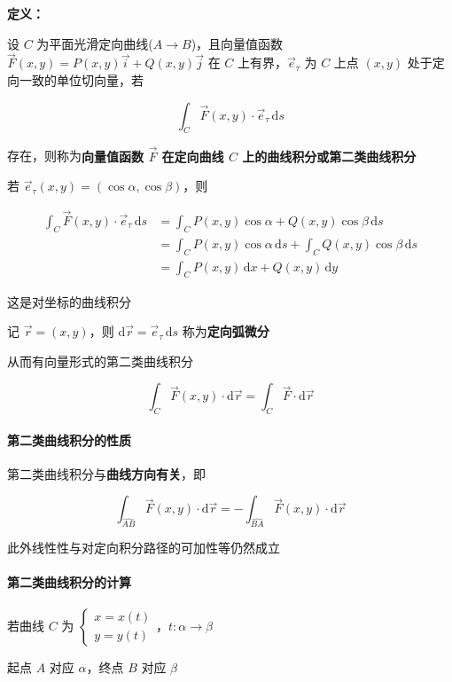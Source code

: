 \documentclass[lang = zh , final , oneside , openany , titlepage , zihao = -4 , linespread = 1.3 , baselineskip = false , cjk-font = windows , text-font = newtx , math-font = newtx]{sjtureport}
\begin{document}
\textbf{定义：}

设 \(C\) 为平面光滑定向曲线(\(A\rightarrow B\))，且向量值函数 \(\vec{F}(x,y) = P(x,y)\vec{i}+Q(x,y)\vec{j}\) 在 \(C\) 上有界，\(\vec{e}_\tau\) 为 \(C\) 上点 \((x,y)\) 处于定向一致的单位切向量，若

\[
\int_C \vec{F}(x,y) \cdot \vec{e}_\tau \,\mathrm{d}s
\]

存在，则称为\textbf{向量值函数 \(\vec{F}\) 在定向曲线 \(C\) 上的曲线积分或第二类曲线积分}

若 \(\vec{e}_\tau(x,y) = (\cos\alpha,\cos\beta)\)，则

\[
\begin{aligned}
  \int_C \vec{F}(x,y) \cdot \vec{e}_\tau \,\mathrm{d}s &= \int_C P(x,y)\cos\alpha + Q(x,y)\cos\beta \,\mathrm{d}s \\
  &= \int_C P(x,y)\cos\alpha \,\mathrm{d}s + \int_C Q(x,y)\cos\beta \,\mathrm{d}s \\
  &= \int_C P(x,y)\,\mathrm{d}x +  Q(x,y)\,\mathrm{d}y
\end{aligned}
\]

这是对坐标的曲线积分

记 \(\vec{r} = (x,y)\)，则 \(\mathrm{d}\vec{r} = \vec{e}_\tau \,\mathrm{d}s\) 称为\textbf{定向弧微分}

从而有向量形式的第二类曲线积分

\[
\int_C \vec{F}(x,y) \cdot \mathrm{d}\vec{r} = \int_C \vec{F}\cdot \mathrm{d}\vec{r}
\]

\paragraph{第二类曲线积分的性质}

第二类曲线积分与\textbf{曲线方向有关}，即

\[
\int_{\widehat{AB}} \vec{F}(x,y) \cdot \mathrm{d}\vec{r} = -\int_{\widehat{BA}} \vec{F}(x,y) \cdot \mathrm{d}\vec{r}
\]

此外线性性与对定向积分路径的可加性等仍然成立

\paragraph{第二类曲线积分的计算}

若曲线 \(C\) 为 \(\begin{cases}x = x(t)\\y = y(t)\end{cases}\)，\(t:\alpha\rightarrow \beta\)

起点 \(A\) 对应 \(\alpha\)，终点 \(B\) 对应 \(\beta\)
\end{document}
